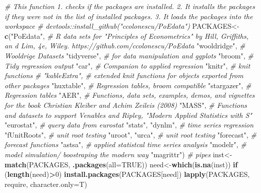 \documentclass[]{book}
\newenvironment{Shaded}{\begin{snugshade}}{\end{snugshade}}
\newcommand{\CommentTok}[1]{\textcolor[rgb]{0.56,0.35,0.01}{\textit{#1}}}
\newcommand{\ControlFlowTok}[1]{\textcolor[rgb]{0.13,0.29,0.53}{\textbf{#1}}}
\newcommand{\DataTypeTok}[1]{\textcolor[rgb]{0.13,0.29,0.53}{#1}}
\newcommand{\DecValTok}[1]{\textcolor[rgb]{0.00,0.00,0.81}{#1}}
\newcommand{\KeywordTok}[1]{\textcolor[rgb]{0.13,0.29,0.53}{\textbf{#1}}}
\newcommand{\NormalTok}[1]{#1}
\newcommand{\OperatorTok}[1]{\textcolor[rgb]{0.81,0.36,0.00}{\textbf{#1}}}
\newcommand{\OtherTok}[1]{\textcolor[rgb]{0.56,0.35,0.01}{#1}}
\newcommand{\StringTok}[1]{\textcolor[rgb]{0.31,0.60,0.02}{#1}}
\begin{document}
\begin{Shaded}
\begin{Highlighting}[]
\CommentTok{# This function 1. checks if the packages are installed. 2. It installs the packages if they were not in the list of installed packages. 3. It loads the packages into the workspace}
\CommentTok{# devtools::install_github("ccolonescu/PoEdata")}
\NormalTok{PACKAGES<-}\KeywordTok{c}\NormalTok{(}\StringTok{"PoEdata"}\NormalTok{, }\CommentTok{# R data sets for "Principles of Econometrics" by Hill, Griffiths, an d Lim, 4e, Wiley. https://github.com/ccolonescu/PoEdata}
\StringTok{"wooldridge"}\NormalTok{,  }\CommentTok{# Wooldrige Datasets}
\StringTok{"tidyverse"}\NormalTok{,  }\CommentTok{# for data manipulation and ggplots}
\StringTok{"broom"}\NormalTok{,  }\CommentTok{# Tidy regression output}
\StringTok{"car"}\NormalTok{, }\CommentTok{# Companion to applied regression}
\StringTok{"knitr"}\NormalTok{, }\CommentTok{# knit functions}
\CommentTok{# "kableExtra", # extended knit functions for objects exported from other packages}
\StringTok{"huxtable"}\NormalTok{, }\CommentTok{#  Regression tables, broom compatible}
\StringTok{"stargazer"}\NormalTok{, }\CommentTok{# Regression tables}
\StringTok{"AER"}\NormalTok{, }\CommentTok{#  Functions, data sets, examples, demos, and vignettes for the book Christian Kleiber and Achim Zeileis (2008)}
\StringTok{"MASS"}\NormalTok{,  }\CommentTok{#  Functions and datasets to support Venables and Ripley,  "Modern Applied Statistics with S"}
\StringTok{"eurostat"}\NormalTok{, }\CommentTok{# query data from eurostat}
\StringTok{"stats"}\NormalTok{, }
\StringTok{"dynlm"}\NormalTok{, }\CommentTok{# time series regression}
\StringTok{"fUnitRoots"}\NormalTok{, }\CommentTok{# unit root testing}
\StringTok{"uroot"}\NormalTok{, }
\StringTok{"urca"}\NormalTok{, }\CommentTok{# unit root testing}
\StringTok{"forecast"}\NormalTok{, }\CommentTok{# forecast functions}
\StringTok{"astsa"}\NormalTok{, }\CommentTok{# applied statistcal time series analysis }
\StringTok{"modelr"}\NormalTok{, }\CommentTok{# model simulation/ boostraping the modern way}
\StringTok{"magrittr"}\NormalTok{) }\CommentTok{#  pipes}
\NormalTok{inst<-}\KeywordTok{match}\NormalTok{(PACKAGES, }\KeywordTok{.packages}\NormalTok{(}\DataTypeTok{all=}\OtherTok{TRUE}\NormalTok{))}
\NormalTok{need<-}\KeywordTok{which}\NormalTok{(}\KeywordTok{is.na}\NormalTok{(inst))}
\ControlFlowTok{if}\NormalTok{ (}\KeywordTok{length}\NormalTok{(need)}\OperatorTok{>}\DecValTok{0}\NormalTok{) }\KeywordTok{install.packages}\NormalTok{(PACKAGES[need])}
\KeywordTok{lapply}\NormalTok{(PACKAGES, require, }\DataTypeTok{character.only=}\NormalTok{T)}
\end{Highlighting}
\end{Shaded}
\end{document}
